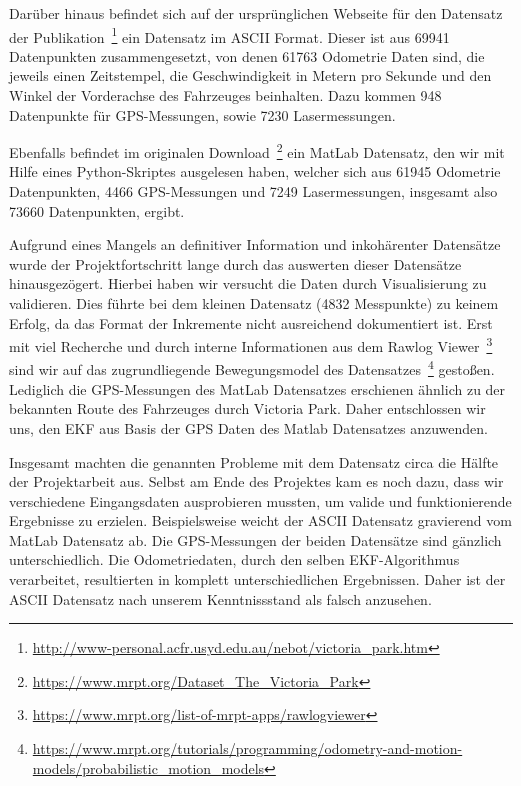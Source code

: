 \documentclass[11pt]{scrartcl}
\begin{document}
Darüber hinaus befindet sich auf der ursprünglichen Webseite für den Datensatz der Publikation~\footnote{\url{http://www-personal.acfr.usyd.edu.au/nebot/victoria_park.htm}} ein Datensatz im ASCII Format. Dieser ist aus 69941 Datenpunkten zusammengesetzt, von denen 61763 Odometrie Daten sind, die jeweils einen Zeitstempel, die Geschwindigkeit in Metern pro Sekunde und den Winkel der Vorderachse des Fahrzeuges beinhalten. Dazu kommen 948 Datenpunkte für GPS-Messungen, sowie 7230 Lasermessungen.

Ebenfalls befindet im originalen Download~\footnote{\url{https://www.mrpt.org/Dataset_The_Victoria_Park}} ein MatLab Datensatz, den wir mit Hilfe eines Python-Skriptes ausgelesen haben, welcher sich aus 61945 Odometrie Datenpunkten, 4466 GPS-Messungen und 7249 Lasermessungen, insgesamt also 73660 Datenpunkten, ergibt.

Aufgrund eines Mangels an definitiver Information und inkohärenter Datensätze wurde der Projektfortschritt lange durch das auswerten dieser Datensätze hinausgezögert. Hierbei haben wir versucht die Daten durch Visualisierung zu validieren. Dies führte bei dem kleinen Datensatz (4832 Messpunkte) zu keinem Erfolg, da das Format der Inkremente nicht ausreichend dokumentiert ist. Erst mit viel Recherche und durch interne Informationen aus dem Rawlog Viewer~\footnote{\url{https://www.mrpt.org/list-of-mrpt-apps/rawlogviewer}} sind wir auf das zugrundliegende Bewegungsmodel des Datensatzes~\footnote{\url{https://www.mrpt.org/tutorials/programming/odometry-and-motion-models/probabilistic_motion_models}} gestoßen. Lediglich die GPS-Messungen des MatLab Datensatzes erschienen ähnlich zu der bekannten Route des Fahrzeuges durch Victoria Park. Daher entschlossen wir uns, den EKF aus Basis der GPS Daten des Matlab Datensatzes anzuwenden.

Insgesamt machten die genannten Probleme mit dem Datensatz circa die Hälfte der Projektarbeit aus. Selbst am Ende des Projektes kam es noch dazu, dass wir verschiedene Eingangsdaten ausprobieren mussten, um valide und funktionierende Ergebnisse zu erzielen. Beispielsweise weicht der ASCII Datensatz gravierend vom MatLab Datensatz ab. Die GPS-Messungen der beiden Datensätze sind gänzlich unterschiedlich. Die Odometriedaten, durch den selben EKF-Algorithmus verarbeitet, resultierten in komplett unterschiedlichen Ergebnissen. Daher ist der ASCII Datensatz nach unserem Kenntniss\-stand als falsch anzusehen.
\end{document}

